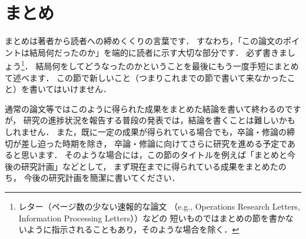 \chapter{まとめ}\label{conclution}
まとめは著者から読者への締めくくりの言葉です．
すなわち，「この論文のポイントは結局何だったのか」を端的に読者に示す大切な部分です．
必ず書きましょう\footnote{レター（ページ数の少ない速報的な論文
（e.g., Operations Research Letters, Information Processing Letters））などの
短いものではまとめの節を書かないように指示されることもあり，そのような場合を除く．}．
結局何をしてどうなったのかということを最後にもう一度手短にまとめて述べます．
この節で新しいこと（つまりこれまでの節で書いて来なかったこと）を書いてはいけません．

通常の論文等ではこのように得られた成果をまとめた結論を書いて終わるのですが，
研究の進捗状況を報告する普段の発表では，結論を書くことは難しいかもしれません．
また，既に一定の成果が得られている場合でも，卒論・修論の締切が差し迫った時期を除き，
卒論・修論に向けてさらに研究を進める予定であると思います．
そのような場合には，この節のタイトルを例えば「まとめと今後の研究計画」などとして，
まず現在までに得られている成果をまとめたのち，
今後の研究計画を簡潔に書いてください．